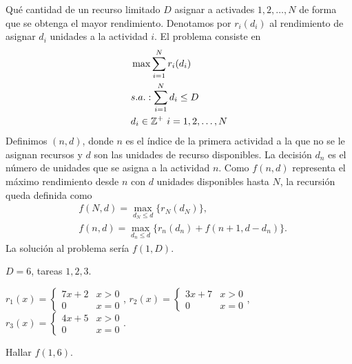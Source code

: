 \documentclass[MIOP.tex]{subfiles}
\begin{document}
\begin{ej} 
Qué cantidad de un recurso limitado $D$ asignar a activades $1,2,\dots, N$ de forma que se obtenga el mayor rendimiento. Denotamos por $r_i(d_i)$ al rendimiento de asignar $d_i$ unidades a la actividad $i$. El problema consiste en 
\begin{align*}
&\max \sum_{i=1}^N r_i(d_i)\\
&s.a.: \sum_{i=1}^N d_i\leq D\\
&      d_i\in\mathbb{Z}^+\ i=1,2,\dots,N
\end{align*}
Definimos $(n,d)$, donde $n$ es el índice de la primera actividad a la que no se le asignan recursos y $d$ son las unidades de recurso disponibles. La decisión $d_n$ es el número de unidades que se asigna a la actividad $n$. Como $f(n,d)$ representa el máximo rendimiento desde $n$ con $d$ unidades disponibles hasta $N$, la recursión queda definida como
\begin{align*}
&f(N,d)=\max_{d_N\leq d}\{r_N(d_N)\},\\
&f(n,d)=\max_{d_n\leq d}\{r_n(d_n)+f(n+1,d-d_n)\}.
\end{align*}
La solución al problema sería $f(1,D)$.
\end{ej}
\begin{ejer} $D=6$, tareas $1,2,3$.

$r_1(x)=\begin{cases}
7x+2 & x>0\\
0 & x=0
\end{cases}$, $r_2(x)=\begin{cases}
3x+7 & x>0\\
0 & x=0
\end{cases}$, $r_3(x)=\begin{cases}
4x+5 & x>0\\
0 & x=0
\end{cases}.$

Hallar $f(1,6)$.


\end{ejer}
\end{document}
